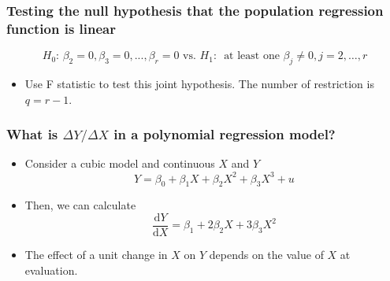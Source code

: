 \documentclass[a4paper,11pt]{article}
\newcommand{\dx}{\mathrm{d}}
\begin{document}
\subsubsection*{Testing the null hypothesis that the population regression function is linear}
\label{sec:org50c8b39}
\[ H_0:\, \beta_2 = 0, \beta_3 = 0, ..., \beta_r = 0 \text{ vs. }
H_1:\, \text{ at least one } \beta_j \neq 0, j = 2, \ldots, r \]
\begin{itemize}
\item Use F statistic to test this joint hypothesis. The number of
restriction is \(q = r-1\).
\end{itemize}


\subsubsection*{What is \(\Delta Y / \Delta X\) in a polynomial regression model?}
\label{sec:orgd6777d1}

\begin{itemize}
\item Consider a cubic model and continuous \(X\) and \(Y\)
\[Y = \beta_0 + \beta_1 X + \beta_2 X^2 + \beta_3 X^3 + u\]
\item Then, we can calculate
\[\frac{\dx Y}{\dx X} = \beta_1 + 2\beta_2 X + 3\beta_3 X^2 \]
\item The effect of a unit change in \(X\) on \(Y\) depends on the value of
\(X\) at evaluation.
\end{itemize}
\end{document}
